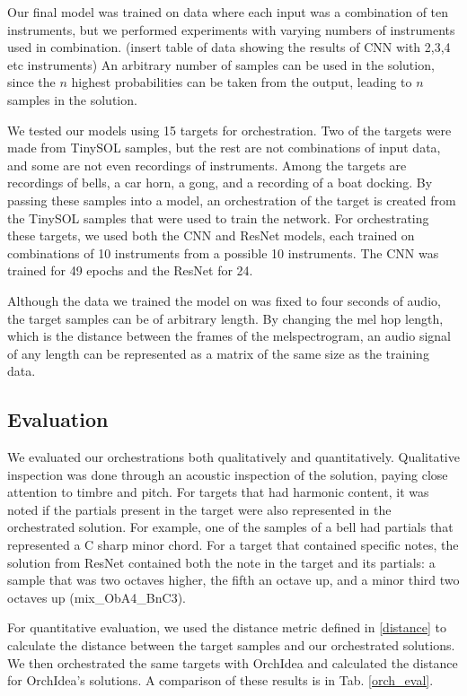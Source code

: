 \documentclass{article}
\begin{document}
Our final model was trained on data where each input was a combination of ten instruments, but we performed experiments with varying numbers of instruments used in combination. (insert table of data showing the results of CNN with 2,3,4 etc instruments) An arbitrary number of samples can be used in the solution, since the $n$ highest probabilities can be taken from the output, leading to $n$ samples in the solution.

We tested our models using 15 targets for orchestration. Two of the targets were made from TinySOL samples, but the rest are not combinations of input data, and some are not even recordings of instruments. Among the targets are recordings of bells, a car horn, a gong, and a recording of a boat docking. By passing these samples into a model, an orchestration of the target is created from the TinySOL samples that were used to train the network. For orchestrating these targets, we used both the CNN and ResNet models, each trained on combinations of 10 instruments from a possible 10 instruments. The CNN was trained for 49 epochs and the ResNet for 24.

Although the data we trained the model on was fixed to four seconds of audio, the target samples can be of arbitrary length. By changing the mel hop length, which is the distance between the frames of the melspectrogram, an audio signal of any length can be represented as a matrix of the same size as the training data.

\subsection{Evaluation}

We evaluated our orchestrations both qualitatively and quantitatively. Qualitative inspection was done through an acoustic inspection of the solution, paying close attention to timbre and pitch. For targets that had harmonic content, it was noted if the partials present in the target were also represented in the orchestrated solution. For example, one of the samples of a bell had partials that represented a C sharp minor chord. For a target that contained specific notes, the solution from ResNet contained both the note in the target and its partials: a sample that was two octaves higher, the fifth an octave up, and a minor third two octaves up (mix\_ObA4\_BnC3).

For quantitative evaluation, we used the distance metric defined in \eqref{distance} to calculate the distance between the target samples and our orchestrated solutions. We then orchestrated the same targets with OrchIdea and calculated the distance for OrchIdea's solutions. A comparison of these results is in Tab. \ref{orch_eval}.
\end{document}
